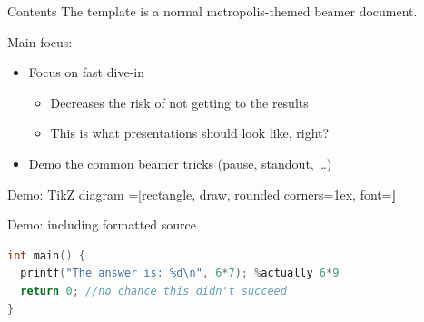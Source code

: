 \documentclass[aspectratio=169]{beamer}
\begin{document}
\begin{frame}{Contents}
The template is a normal metropolis-themed beamer document.

Main focus:
\begin{itemize}
\item Focus on fast dive-in \pause
  \begin{itemize}
  \item Decreases the risk of not getting to the results
  \item This is what presentations should look like, right? \pause
  \end{itemize}
\item Demo the common beamer tricks (pause, standout, \dots)
\end{itemize}
\end{frame}

\begin{frame}{Demo: TikZ diagram}
\centering
{}=[rectangle, draw, rounded corners=1ex, font=\huge\bfseries]
\end{frame}

\begin{frame}[fragile]{Demo: including formatted source}

\begin{lstlisting}[language=C,showstringspaces=false,basicstyle=\tt\small,commentstyle=\color{green!50!black},keywordstyle=\bfseries\color{blue!50!black},stringstyle=\color{red!50!black}]
int main() {
  printf("The answer is: %d\n", 6*7); %actually 6*9
  return 0; //no chance this didn't succeed
}
\end{lstlisting}
\end{frame}
\end{document}
